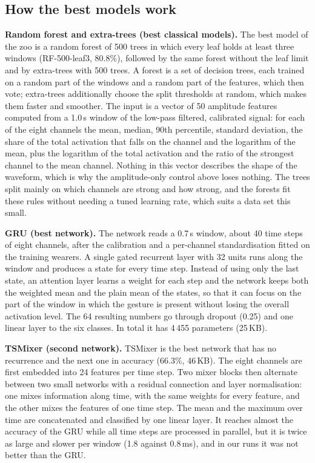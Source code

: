 \documentclass[conference]{IEEEtran}
\begin{document}
\subsection{How the best models work}
\textbf{Random forest and extra-trees (best classical models).} The best model of the
zoo is a random forest of 500 trees in which every leaf holds at least three windows
(RF-500-leaf3, 80.8\%), followed by the same forest without the leaf limit and by
extra-trees with 500 trees. A forest is a set of decision trees, each trained on a
random part of the windows and a random part of the features, which then vote; extra-trees
additionally choose the split thresholds at random, which makes them faster and
smoother. The input is a vector of 50 amplitude features computed from a 1.0\,s window
of the low-pass filtered, calibrated signal: for each of the eight channels the mean,
median, 90th percentile, standard deviation, the share of the total activation that
falls on the channel and the logarithm of the mean, plus the logarithm of the total
activation and the ratio of the strongest channel to the mean channel. Nothing in this vector describes the shape of
the waveform, which is why the amplitude-only control above loses nothing. The trees
split mainly on which channels are strong and how strong, and the forests fit these
rules without needing a tuned learning rate, which suits a data set this small.

\textbf{GRU (best network).} The network reads a 0.7\,s window, about 40 time steps of
eight channels, after the calibration and a per-channel standardisation fitted on the
training wearers. A single gated recurrent layer with 32 units runs along the window
and produces a state for every time step. Instead of using only the last state, an
attention layer learns a weight for each step and the network keeps both the weighted
mean and the plain mean of the states, so that it can focus on the part of the window in
which the gesture is present without losing the overall activation level. The 64
resulting numbers go through dropout (0.25) and one linear layer to the six classes.
In total it has 4\,455 parameters (25\,KB).

\textbf{TSMixer (second network).} TSMixer is the best network that has no recurrence
and the next one in accuracy (66.3\%, 46\,KB). The eight channels are first embedded
into 24 features per time step. Two mixer blocks then alternate between two small
networks with a residual connection and layer normalisation: one mixes information
along time, with the same weights for every feature, and the other mixes the features of
one time step. The mean and the maximum over time are concatenated and classified by one
linear layer. It reaches almost the accuracy of the GRU while all time steps are
processed in parallel, but it is twice as large and slower per window (1.8 against
0.8\,ms), and in our runs it was not better than the GRU.
\end{document}

